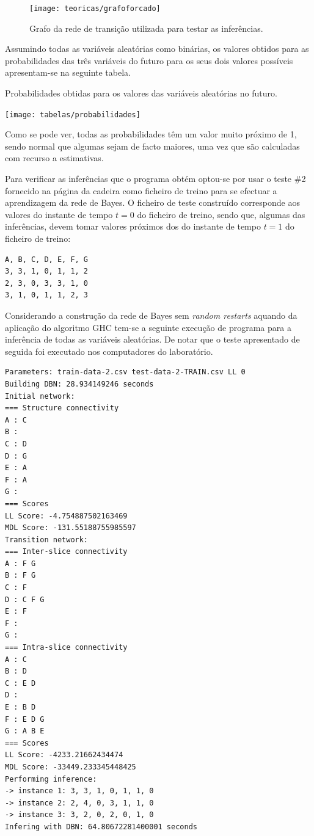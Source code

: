 \documentclass[10pt]{article}
\numberwithin{equation}{section}
\begin{document}
\begin{figure}[H]
	\centering
	\texttt{[image: teoricas/grafoforcado]}
	\caption{Grafo da rede de transição utilizada para testar as inferências.}
	\vspace{-0.8em}
\end{figure}

Assumindo todas as variáveis aleatórias como binárias, os valores obtidos para as probabilidades das três variáveis do futuro para os seus dois valores possíveis apresentam-se na seguinte tabela.

\begin{table}[H]
	\centering
	\caption{Probabilidades obtidas para os valores das variáveis aleatórias no futuro.}
	\vspace{-1.5mm}
	\texttt{[image: tabelas/probabilidades]}
\end{table}

\vspace{-1.5mm}
Como se pode ver, todas as probabilidades têm um valor muito próximo de 1, sendo normal que algumas sejam de facto maiores, uma vez que são calculadas com recurso a estimativas.

Para verificar as inferências que o programa obtém optou-se por usar o teste \#2 fornecido na página da cadeira como ficheiro de treino para se efectuar a aprendizagem da rede de Bayes. O ficheiro de teste construído corresponde aos valores do instante de tempo $t = 0$ do ficheiro de treino, sendo que, algumas das inferências, devem tomar valores próximos dos do instante de tempo $t = 1$ do ficheiro de treino:

\begin{lstlisting}
A, B, C, D, E, F, G
3, 3, 1, 0, 1, 1, 2
2, 3, 0, 3, 3, 1, 0
3, 1, 0, 1, 1, 2, 3
\end{lstlisting}

Considerando a construção da rede de Bayes sem \textit{random restarts} aquando da aplicação do algoritmo GHC tem-se a seguinte execução de programa para a inferência de todas as variáveis aleatórias. De notar que o teste apresentado de seguida foi executado nos computadores do laboratório.

\begin{lstlisting}
Parameters: train-data-2.csv test-data-2-TRAIN.csv LL 0
Building DBN: 28.934149246 seconds
Initial network:
=== Structure connectivity
A : C
B :
C : D
D : G
E : A
F : A
G :
=== Scores
LL Score: -4.754887502163469
MDL Score: -131.55188755985597
Transition network:
=== Inter-slice connectivity
A : F G
B : F G
C : F
D : C F G
E : F
F :
G :
=== Intra-slice connectivity
A : C
B : D
C : E D
D :
E : B D
F : E D G
G : A B E
=== Scores
LL Score: -4233.21662434474
MDL Score: -33449.233345448425
Performing inference:
-> instance 1: 3, 3, 1, 0, 1, 1, 0
-> instance 2: 2, 4, 0, 3, 1, 1, 0
-> instance 3: 3, 2, 0, 2, 0, 1, 0
Infering with DBN: 64.80672281400001 seconds
\end{lstlisting}
\end{document}
